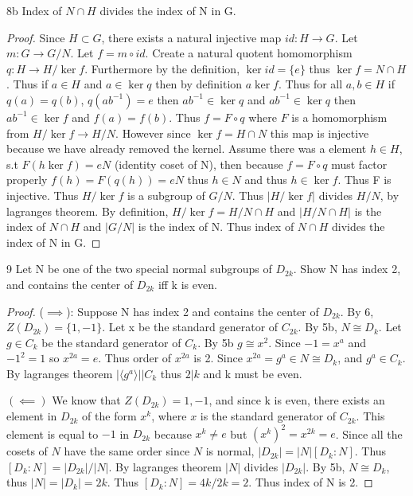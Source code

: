 \documentclass{article}
\newcommand{\abs}[1]{\lvert #1\rvert}
\newcommand{\angles}[1]{\langle{#1}\rangle}
\begin{document}
\begin{claim}{8b}
    Index of $N \cap H$ divides the index of N in G.
\end{claim}
\begin{proof}
    Since $H \subset G$, there exists a natural injective map $id: H \to G$. Let $m: G \to G/N$. Let $f = m \circ id$. Create a natural quotent homomorphism $q: H \to H / \ker f$. Furthermore by the definition, $\ker id = \{e\}$ thus $\ker f = N \cap H$. Thus if $a \in H$ and $a \in \ker q$ then by definition $a \ker f$. Thus for all $a, b \in H$ if $q(a) = q(b)$, $q(ab^{-1}) = e$ then $ab^{-1} \in \ker q$ and $ab^{-1} \in \ker q$ then $ab^{-1} \in \ker f$ and $f(a) = f(b)$. Thus $f = F \circ q$ where $F$ is a homomorphism from $H / \ker f \to H / N$. However since $\ker f = H \cap N$ this map is injective because we have already removed the kernel. Assume there was a element $h \in H$, s.t $F(h \ker f) = eN$ (identity coset of N), then because $f = F \circ q$ must factor properly $f(h) = F(q(h)) = eN$ thus $h \in N$ and thus $h \in \ker f$. Thus F is injective. Thus $H / \ker f$ is a subgroup of $G / N$. Thus $\abs{H / \ker f}$ divides $H / N$, by lagranges theorem. By definition, $H / \ker f = H/N\cap H$ and $\abs{H/N\cap H}$ is the index of $N \cap H$ and $\abs{G / N}$ is the index of N. Thus index of $N \cap H$ divides the index of N in G.
\end{proof}

\bigskip

\begin{PROB}{9}\label{Problem 9.}
    Let N be one of the two special normal subgroups of $D_{2k}$.  Show N has index 2, and contains the center of $D_{2k}$ iff k is even. 
\end{PROB}
\begin{proof}
    ($\implies$): Suppose N has index 2 and contains the center of $D_{2k}$. By 6, $Z(D_{2k}) = \{1, -1\}$. Let x be the standard generator of $C_{2k}$. By 5b, $N \cong D_k$. Let $g \in C_k$ be the standard generator of $C_k$. By 5b $g \cong x^2$. Since $-1 = x^a$ and $-1^2 = 1$ so $x^{2a} = e$. Thus order of $x^{2a}$ is 2. Since $x^{2a} = g^a \in N \cong D_k$, and $g^a \in C_k$. By lagranges theorem $\abs{\angles{g^a}} | C_k$ thus $2 | k$ and k must be even.

    $(\impliedby)$ We know that $Z(D_{2k}) = {1, -1}$, and since k is even, there exists an element in $D_{2k}$ of the form $x^k$, where $x$ is the standard generator of $C_{2k}$. This element is equal to $-1$ in $D_{2k}$ because $x^k \neq e$ but $(x^k)^2 = x^{2k} = e$. Since all the cosets of $N$ have the same order since $N$ is normal, $\abs{D_{2k}} = \abs{N}[D_k : N]$. Thus $[D_k : N] = \abs{D_{2k}}/\abs{N}$. By lagranges theorem $\abs{N}$ divides $\abs{D_{2k}}$. By 5b, $N \cong D_k$, thus $\abs{N} = \abs{D_{k}} = 2k$. Thus $[D_k : N] = 4k/2k = 2$. Thus index of N is 2.
\end{proof}
\end{document}
